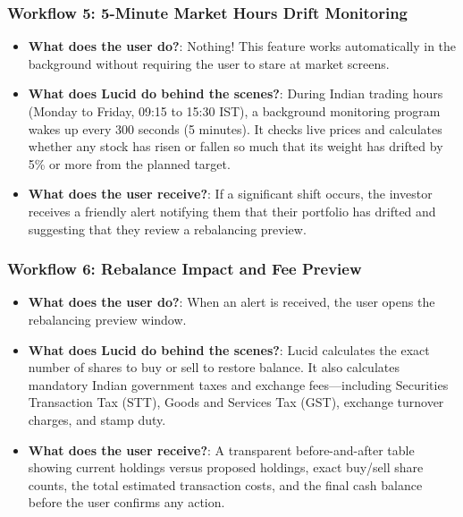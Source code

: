 \subsubsection{Workflow 5: 5-Minute Market Hours Drift Monitoring}
\begin{itemize}
    \item \textbf{What does the user do?}: Nothing! This feature works automatically in the background without requiring the user to stare at market screens.
    \item \textbf{What does Lucid do behind the scenes?}: During Indian trading hours (Monday to Friday, 09:15 to 15:30 IST), a background monitoring program wakes up every 300 seconds (5 minutes). It checks live prices and calculates whether any stock has risen or fallen so much that its weight has drifted by 5\% or more from the planned target.
    \item \textbf{What does the user receive?}: If a significant shift occurs, the investor receives a friendly alert notifying them that their portfolio has drifted and suggesting that they review a rebalancing preview.
\end{itemize}

\subsubsection{Workflow 6: Rebalance Impact and Fee Preview}
\begin{itemize}
    \item \textbf{What does the user do?}: When an alert is received, the user opens the rebalancing preview window.
    \item \textbf{What does Lucid do behind the scenes?}: Lucid calculates the exact number of shares to buy or sell to restore balance. It also calculates mandatory Indian government taxes and exchange fees—including Securities Transaction Tax (STT), Goods and Services Tax (GST), exchange turnover charges, and stamp duty.
    \item \textbf{What does the user receive?}: A transparent before-and-after table showing current holdings versus proposed holdings, exact buy/sell share counts, the total estimated transaction costs, and the final cash balance before the user confirms any action.
\end{itemize}

